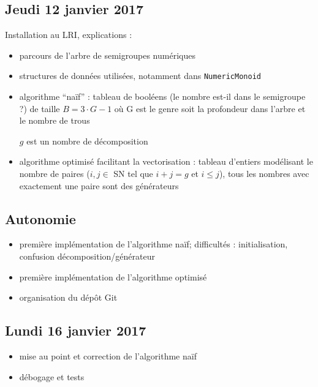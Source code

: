 \documentclass[12pt,a4paper]{article}
\let\leq\leqslant
\begin{document}
\subsection*{Jeudi 12 janvier 2017}
Installation au LRI, explications :
\begin{itemize}
	\item	parcours de l'arbre de semigroupes numériques

	\item	structures de données utilisées, notamment dans \texttt{NumericMonoid}

	\item	algorithme ``naïf'' : tableau de booléens (le nombre est-il dans le semigroupe ?) de taille $B = 3 \cdot G - 1$ où G est le genre soit la profondeur dans l'arbre et le nombre de trous
			\begin{algorithmic}
								\STATE $g$ est un nombre de décomposition
							\ENDIF
						\ENDFOR
					\ENDIF
				\ENDFOR
			\end{algorithmic}

	\item	algorithme optimisé facilitant la vectorisation : tableau d'entiers modélisant le nom\-bre de paires ($i, j \in$ SN tel que $i + j = g$ et $i \leq j$), tous les nombres avec exactement une paire sont des générateurs
\end{itemize}

\subsection*{Autonomie}
\begin{itemize}
	\item	première implémentation de l'algorithme naïf; difficultés : initialisation, confusion décomposition/générateur
	\item	première implémentation de l'algorithme optimisé
	\item	organisation du dépôt Git
\end{itemize}

\subsection*{Lundi 16 janvier 2017}
\begin{itemize}
	\item	mise au point et correction de l'algorithme naïf
	\item	débogage et tests
\end{itemize}
\end{document}
